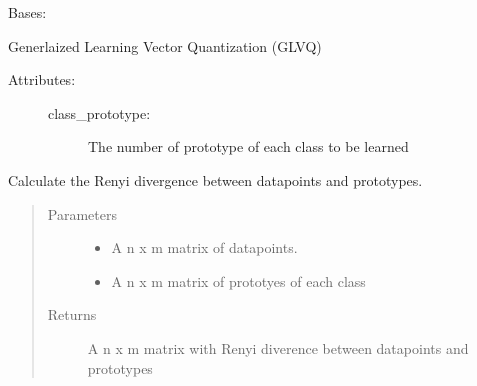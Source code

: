 \documentclass[letterpaper,10pt,english]{sphinxmanual}
\begin{document}
\begin{fulllineitems}
\label{\detokenize{Renyi_final:Renyi_final.GLVQ}}
\sphinxAtStartPar
Bases: 

\sphinxAtStartPar
Generlaized Learning Vector Quantization (GLVQ)
\begin{description}
\item[{Attributes:}] \leavevmode\begin{description}
\item[{class\_prototype:}] \leavevmode
\sphinxAtStartPar
The number of prototype of each class to be learned

\end{description}

\end{description}

\begin{fulllineitems}
\label{\detokenize{Renyi_final:Renyi_final.GLVQ.Renyi_Divergence}}
\sphinxAtStartPar
Calculate the Renyi divergence between datapoints and prototypes.
\begin{quote}\begin{description}
\item[{Parameters}] \leavevmode\begin{itemize}
\item {} 
\sphinxAtStartPar
{} \textendash{} A n x m matrix of datapoints.

\item {} 
\sphinxAtStartPar
{} \textendash{} A n x m matrix of prototyes of each class

\end{itemize}

\item[{Returns}] \leavevmode
\sphinxAtStartPar
A n x m matrix with Renyi diverence between datapoints and prototypes

\end{description}\end{quote}


\end{fulllineitems}
\end{fulllineitems}
\end{document}
